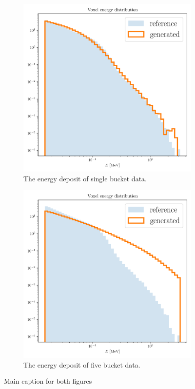 \begin{figure}[htbp]
    \centering
    \begin{subfigure}[b]{0.45\textwidth} %
        \includegraphics[width=\textwidth]{Figures/energy_voxel_single.png}
        \caption{The energy deposit of single bucket data.}
        \label{fig:fig1}
    \end{subfigure}
    \hfill %
    \begin{subfigure}[b]{0.45\textwidth}
        \includegraphics[width=\textwidth]{Figures/energy_voxel_full.png}
        \caption{The energy deposit of five bucket data.}
        \label{fig:fig2}
    \end{subfigure}
    
    \caption{Main caption for both figures}
    \label{fig:main}
\end{figure}

